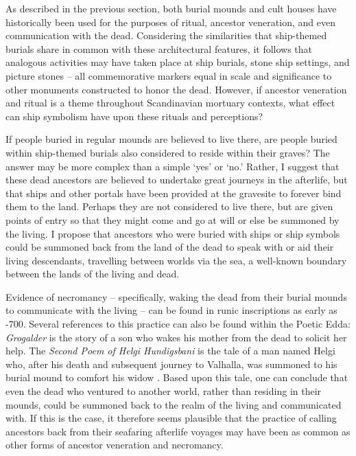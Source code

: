 As described in the previous section, both burial mounds and cult houses have historically been used for the purposes of ritual, ancestor veneration, and even communication with the dead. Considering the similarities that ship-themed burials share in common with these architectural features, it follows that analogous activities may have taken place at ship burials, stone ship settings, and picture stones – all commemorative markers equal in scale and significance to other monuments constructed to honor the dead. However, if ancestor veneration and ritual is a theme throughout Scandinavian mortuary contexts, what effect can ship symbolism have upon these rituals and perceptions?

If people buried in regular mounds are believed to live there, are people buried within ship-themed burials also considered to reside within their graves? The answer may be more complex than a simple ‘yes’ or ‘no.’ Rather, I suggest that these dead ancestors are believed to undertake great journeys in the afterlife, but that ships and other portals have been provided at the gravesite to forever bind them to the land. Perhaps they are not considered to live there, but are given points of entry so that they might come and go at will or else be summoned by the living. I propose that ancestors who were buried with ships or ship symbols could be summoned back from the land of the dead to speak with or aid their living descendants, travelling between worlds via the sea, a well-known boundary between the lands of the living and dead.

Evidence of necromancy – specifically, waking the dead from their burial mounds to communicate with the living – can be found in runic inscriptions as early as -700. Several references to this practice can also be found within the Poetic Edda: \textit{Grogalder} is the story of a son who wakes his mother from the dead to solicit her help.
The \textit{Second Poem of Helgi Hundigsbani} is the tale of a man named Helgi who, after his death and subsequent journey to Valhalla, was summoned to his burial mound to comfort his widow \parencite[171]{Sanmark_2010}.  Based upon this tale, one can conclude that even the dead who ventured to another world, rather than residing in their mounds, could be summoned back to the realm of the living and communicated with. If this is the case, it therefore seems plausible that the practice of calling ancestors back from their seafaring afterlife voyages may have been as common as other forms of ancestor veneration and necromancy.

